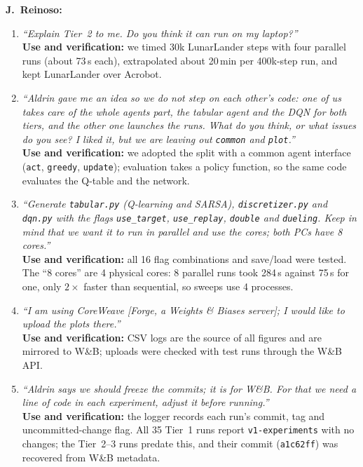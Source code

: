 \documentclass[conference]{IEEEtran}
\begin{document}
\textbf{J.~Reinoso:}
\begin{enumerate}
  \item \textit{``Explain Tier~2 to me. Do you think it can run on my laptop?''}\\
        \textbf{Use and verification:} we timed 30k LunarLander steps with four parallel
        runs (about 73\,s each), extrapolated about 20\,min per 400k-step run, and kept
        LunarLander over Acrobot.
  \item \textit{``Aldrin gave me an idea so we do not step on each other's code: one of us
        takes care of the whole agents part, the tabular agent and the DQN for both tiers,
        and the other one launches the runs. What do you think, or what issues do you see?
        I liked it, but we are leaving out \texttt{common} and \texttt{plot}.''}\\
        \textbf{Use and verification:} we adopted the split with a common agent interface
        (\texttt{act}, \texttt{greedy}, \texttt{update}); evaluation takes a policy
        function, so the same code evaluates the Q-table and the network.
  \item \textit{``Generate \texttt{tabular.py} (Q-learning and SARSA),
        \texttt{discretizer.py} and \texttt{dqn.py} with the flags \texttt{use\_target},
        \texttt{use\_replay}, \texttt{double} and \texttt{dueling}. Keep in mind that we
        want it to run in parallel and use the cores; both PCs have 8 cores.''}\\
        \textbf{Use and verification:} all 16 flag combinations and save/load were tested.
        The ``8 cores'' are 4 physical cores: 8 parallel runs took 284\,s against 75\,s
        for one, only $2\times$ faster than sequential, so sweeps use 4 processes.
  \item \textit{``I am using CoreWeave [Forge, a Weights \& Biases server]; I would like
        to upload the plots there.''}\\
        \textbf{Use and verification:} CSV logs are the source of all figures and are
        mirrored to W\&B; uploads were checked with test runs through the W\&B API.
  \item \textit{``Aldrin says we should freeze the commits; it is for W\&B. For that we
        need a line of code in each experiment, adjust it before running.''}\\
        \textbf{Use and verification:} the logger records each run's commit, tag and
        uncommitted-change flag. All 35 Tier~1 runs report \texttt{v1-experiments} with no
        changes; the Tier~2--3 runs predate this, and their commit (\texttt{a1c62ff}) was
        recovered from W\&B metadata.
\end{enumerate}
\end{document}
